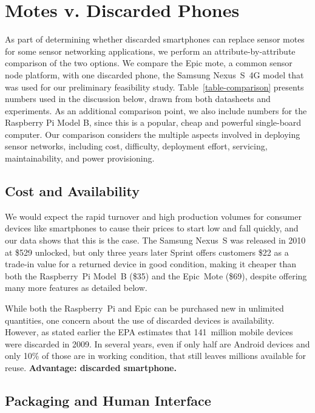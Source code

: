 \section{Motes v. Discarded Phones}
\label{sec-comparison}



As part of determining whether discarded smartphones can replace sensor motes
for some sensor networking applications, we perform an attribute-by-attribute
comparison of the two options. We compare the Epic mote, a common sensor node
platform, with one discarded phone, the Samsung Nexus~S~4G  model that was
used for our preliminary feasibility study. Table~\ref{table-comparison}
presents numbers used in the discussion below, drawn from both datasheets and
experiments. As an additional comparison point, we also include numbers for
the Raspberry Pi Model B, since this is a popular, cheap and powerful
single-board computer. Our comparison considers the multiple aspects involved
in deploying sensor networks, including cost, difficulty, deployment effort,
servicing, maintainability, and power provisioning.

\subsection{Cost and Availability}

We would expect the rapid turnover and high production volumes for consumer
devices like smartphones to cause their prices to start low and fall quickly,
and our data shows that this is the case. The Samsung Nexus~S was released in
2010 at \$529 unlocked, but only three years later Sprint offers customers
\$22 as a trade-in value for a returned device in good condition, making it
cheaper than both the Raspberry~Pi Model~B (\$35) and the Epic~Mote (\$69),
despite offering many more features as detailed below.

While both the Raspberry~Pi and Epic can be purchased new in unlimited
quantities, one concern about the use of discarded devices is availability.
However, as stated earlier the EPA estimates that 141~million mobile devices
were discarded in 2009. In several years, even if only half are Android
devices and only 10\% of those are in working condition, that still leaves
millions available for reuse. \textbf{Advantage: discarded smartphone.}

\subsection{Packaging and Human Interface}

